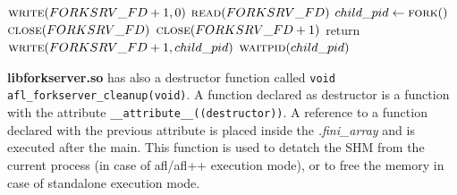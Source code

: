 \begin{algorithm}[h]
    \caption{AFL forkserver algorithm}
    \label{alg:afl_forkserver}
    \begin{algorithmic}
        \STATE $\textsc{write}(FORKSRV\_FD+1,0)$
            \STATE $\textsc{read}(FORKSRV\_FD)$
            \STATE $child\_pid \gets \textsc{fork}()$
                \STATE $\textsc{close}(FORKSRV\_FD)$ \COMMENT{\small \textcolor{green!60!black}{The child must return from the forkserver and execute the main, so the child process can close the file descriptors}}
                \STATE $\textsc{close}(FORKSRV\_FD+1)$
                \STATE $\text{return}$
            \ELSE
                \STATE $\textsc{write}(FORKSRV\_FD+1,child\_pid)$  \COMMENT{\small \textcolor{green!60!black}{Communicate the PID of the child to the fuzzer}}
                \STATE $\textsc{waitpid}(child\_pid)$
            \ENDIF
        \ENDWHILE
    \end{algorithmic}
\end{algorithm}

\textbf{libforkserver.so} has also a destructor function called \texttt{void afl\_forkserver\_cleanup(void)}.
A function declared as destructor is a function with the attribute \texttt{\_\_attribute\_\_((destructor))}.
A reference to a function declared with the previous attribute is placed inside the \textit{.fini\_array} and is executed 
after the main.
This function is used to detatch the \gls{SHM} from the current process (in case of afl/afl++ execution mode), or to 
free the memory in case of standalone execution mode.